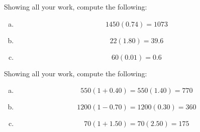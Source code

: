 \documentclass[12pt,letterpaper]{exam}
\begin{document}
\begin{questions}
\newpage
\question Showing all your work, compute the following:
	 \pspace

\sol
\begin{enumerate}[(a)]
\item 
	\[
	1450 (0.74)= 1073
	\] \pspace

\item 
	\[
	22(1.80)= 39.6
	\] \pspace

\item 
	\[
	60(0.01)= 0.6
	\]
\end{enumerate}



\newpage
\question Showing all your work, compute the following:
	 \pspace

\sol
\begin{enumerate}[(a)]
\item 
	\[
	550(1 + 0.40)= 550(1.40)= 770
	\] \pspace

\item 
	\[
	1200(1 - 0.70)= 1200(0.30)= 360 
	\] \pspace

\item 
	\[
	70(1 + 1.50)= 70(2.50)= 175
	\]
\end{enumerate}




\end{questions}
\end{document}

